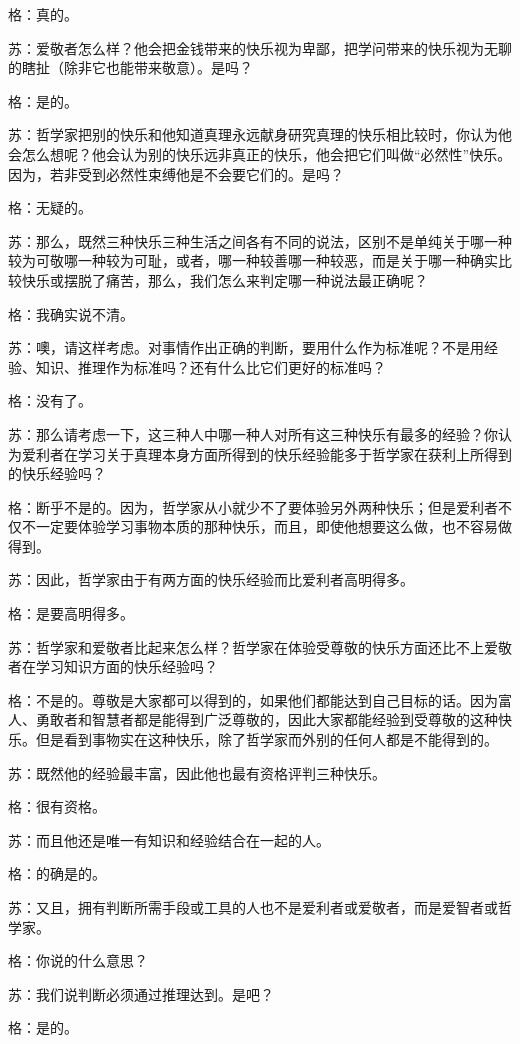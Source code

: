 \documentclass[12pt,oneside]{book}
\begin{document}
格：真的。

苏：爱敬者怎么样？他会把金钱带来的快乐视为卑鄙，把学问带来的快乐视为无聊的瞎扯（除非它也能带来敬意）。是吗？

格：是的。

苏：哲学家把别的快乐和他知道真理永远献身研究真理的快乐相比较时，你认为他会怎么想呢？他会认为别的快乐远非真正的快乐，他会把它们叫做“必然性”快乐。因为，若非受到必然性束缚他是不会要它们的。是吗？

格：无疑的。

苏：那么，既然三种快乐三种生活之间各有不同的说法，区别不是单纯关于哪一种较为可敬哪一种较为可耻，或者，哪一种较善哪一种较恶，而是关于哪一种确实比较快乐或摆脱了痛苦，那么，我们怎么来判定哪一种说法最正确呢？

格：我确实说不清。

苏：噢，请这样考虑。对事情作出正确的判断，要用什么作为标准呢？不是用经验、知识、推理作为标准吗？还有什么比它们更好的标准吗？

格：没有了。

苏：那么请考虑一下，这三种人中哪一种人对所有这三种快乐有最多的经验？你认为爱利者在学习关于真理本身方面所得到的快乐经验能多于哲学家在获利上所得到的快乐经验吗？

格：断乎不是的。因为，哲学家从小就少不了要体验另外两种快乐；但是爱利者不仅不一定要体验学习事物本质的那种快乐，而且，即使他想要这么做，也不容易做得到。

苏：因此，哲学家由于有两方面的快乐经验而比爱利者高明得多。

格：是要高明得多。

苏：哲学家和爱敬者比起来怎么样？哲学家在体验受尊敬的快乐方面还比不上爱敬者在学习知识方面的快乐经验吗？

格：不是的。尊敬是大家都可以得到的，如果他们都能达到自己目标的话。因为富人、勇敢者和智慧者都是能得到广泛尊敬的，因此大家都能经验到受尊敬的这种快乐。但是看到事物实在这种快乐，除了哲学家而外别的任何人都是不能得到的。

苏：既然他的经验最丰富，因此他也最有资格评判三种快乐。

格：很有资格。

苏：而且他还是唯一有知识和经验结合在一起的人。

格：的确是的。

苏：又且，拥有判断所需手段或工具的人也不是爱利者或爱敬者，而是爱智者或哲学家。

格：你说的什么意思？

苏：我们说判断必须通过推理达到。是吧？

格：是的。
\end{document}
